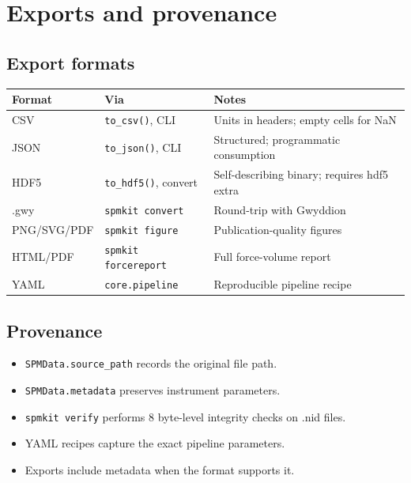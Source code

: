 \documentclass[a4paper,11pt]{article}
\begin{document}
\section{Exports and provenance}

\subsection{Export formats}

\begin{tabularx}{\linewidth}{@{}>{\ttfamily}l l X@{}}
\toprule
Format & Via & Notes \\
\midrule
CSV & \texttt{to\_csv()}, CLI & Units in headers; empty cells for NaN \\
JSON & \texttt{to\_json()}, CLI & Structured; programmatic consumption \\
HDF5 & \texttt{to\_hdf5()}, convert & Self-describing binary; requires hdf5 extra \\
.gwy & \texttt{spmkit convert} & Round-trip with Gwyddion \\
PNG/SVG/PDF & \texttt{spmkit figure} & Publication-quality figures \\
HTML/PDF & \texttt{spmkit forcereport} & Full force-volume report \\
YAML & \texttt{core.pipeline} & Reproducible pipeline recipe \\
\bottomrule
\end{tabularx}

\subsection{Provenance}
\begin{itemize}[nosep]
  \item \texttt{SPMData.source\_path} records the original file path.
  \item \texttt{SPMData.metadata} preserves instrument parameters.
  \item \texttt{spmkit verify} performs 8 byte-level integrity checks on .nid files.
  \item YAML recipes capture the exact pipeline parameters.
  \item Exports include metadata when the format supports it.
\end{itemize}

\end{document}
